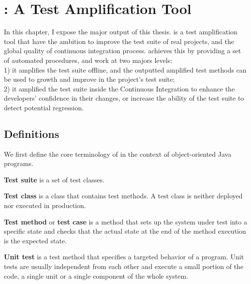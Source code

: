 \chapter{\dspot: A Test Amplification Tool}
\label{chapter:dspot}

\begin{chaptersummary}
		In this chapter, I expose the major output of this thesis. \dspot is a test amplification tool that have the ambition to improve the test suite of real projects, and the global quality of continuous integration process.
		\dspot achieves this by providing a set of automated procedures, and work at two majors levels:\\
		1) it amplifies the test suite offline, and the outputted amplified test methods can be used to growth and improve in the project's test suite;\\
		2) it amplified the test suite inside the Continuous Integration to enhance the developers' confidence in their changes, or increase the ability of the test suite to detect potential regression.
\end{chaptersummary}

\minitoc

\graphicspath{{.}{chapitres/dspot/}}

\section{Definitions}

We first define the core terminology of \dspot in the context of object-oriented Java programs.

\textbf{Test suite} is a set of test classes.

\textbf{Test class} is a class that contains test methods. A test class is neither deployed nor executed in production.

\textbf{Test method} or \textbf{test case} is a method that sets up the system under test into a specific state and checks that the actual state at the end of the method execution is the expected state.

\textbf{Unit test} is a test method that specifies a targeted behavior of a program. 
Unit tests are usually independent from each other and execute a small portion of the code, \ie a single unit or a single component of the whole system.


